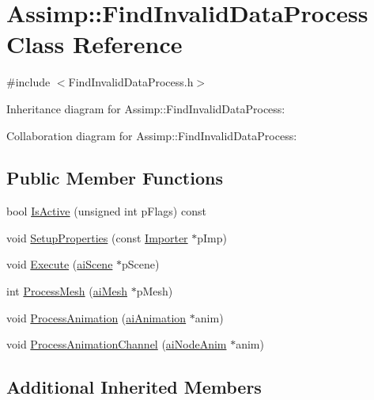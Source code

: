 \hypertarget{class_assimp_1_1_find_invalid_data_process}{\section{Assimp\+:\+:Find\+Invalid\+Data\+Process Class Reference}
\label{class_assimp_1_1_find_invalid_data_process}
}


{\ttfamily \#include $<$Find\+Invalid\+Data\+Process.\+h$>$}



Inheritance diagram for Assimp\+:\+:Find\+Invalid\+Data\+Process\+:


Collaboration diagram for Assimp\+:\+:Find\+Invalid\+Data\+Process\+:
\subsection*{Public Member Functions}
\begin{DoxyCompactItemize}
\item 
bool \hyperlink{class_assimp_1_1_find_invalid_data_process_af3e3c068c6475c5f6ba0312e7c8b3e6a}{Is\+Active} (unsigned int p\+Flags) const 
\item 
void \hyperlink{class_assimp_1_1_find_invalid_data_process_a513544358e1d55ba72d3120945faeef7}{Setup\+Properties} (const \hyperlink{class_assimp_1_1_importer}{Importer} $\ast$p\+Imp)
\item 
void \hyperlink{class_assimp_1_1_find_invalid_data_process_a32ad25ce5450915d722b7e7236e2ccac}{Execute} (\hyperlink{structai_scene}{ai\+Scene} $\ast$p\+Scene)
\item 
int \hyperlink{class_assimp_1_1_find_invalid_data_process_a874e19a4618a285f68a8aea6f6f89cec}{Process\+Mesh} (\hyperlink{structai_mesh}{ai\+Mesh} $\ast$p\+Mesh)
\item 
void \hyperlink{class_assimp_1_1_find_invalid_data_process_a59e3f1f896663ff934f16636536da11f}{Process\+Animation} (\hyperlink{structai_animation}{ai\+Animation} $\ast$anim)
\item 
void \hyperlink{class_assimp_1_1_find_invalid_data_process_ae510194029bf6f08040edf9d3403e673}{Process\+Animation\+Channel} (\hyperlink{structai_node_anim}{ai\+Node\+Anim} $\ast$anim)
\end{DoxyCompactItemize}
\subsection*{Additional Inherited Members}


